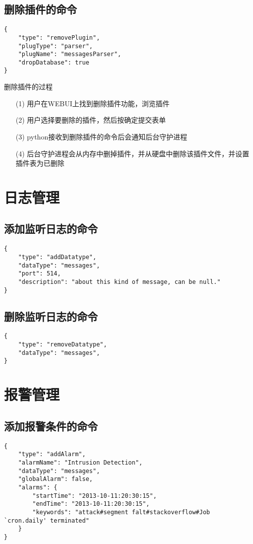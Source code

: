 \documentclass{article}
\begin{document}
\subsection{删除插件的命令}
\begin{verbatim}
{
    "type": "removePlugin",
    "plugType": "parser",
    "plugName": "messagesParser",
    "dropDatabase": true
}
\end{verbatim}
\textsf{删除插件的过程}
\begin{itemize}
\item[(1)] 用户在WEBUI上找到删除插件功能，浏览插件
\item[(2)] 用户选择要删除的插件，然后按确定提交表单
\item[(3)] python接收到删除插件的命令后会通知后台守护进程
\item[(4)] 后台守护进程会从内存中删掉插件，并从硬盘中删除该插件文件，并设置插件表为已删除
\end{itemize}


\section{日志管理}
\subsection{添加监听日志的命令}
\begin{verbatim}
{
    "type": "addDatatype",
    "dataType": "messages",
    "port": 514,
    "description": "about this kind of message, can be null."
}
\end{verbatim}

\subsection{删除监听日志的命令}
\begin{verbatim}
{
    "type": "removeDatatype",
    "dataType": "messages",
}
\end{verbatim}

\section{报警管理}
\subsection{添加报警条件的命令}
\begin{verbatim}
{
    "type": "addAlarm",
    "alarmName": "Intrusion Detection",
    "dataType": "messages",
    "globalAlarm": false,
    "alarms": {
        "startTime": "2013-10-11:20:30:15",
        "endTime": "2013-10-11:20:30:15",
        "keywords": "attack#segment falt#stackoverflow#Job `cron.daily' terminated"
    }
}
\end{verbatim}
\end{document}
